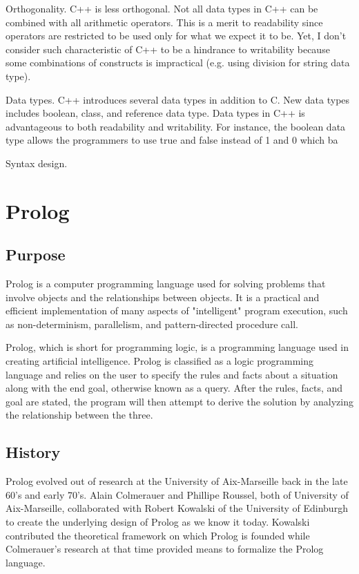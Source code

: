 \documentclass[a4paper, 12pt]{article}
\begin{document}
Orthogonality. C++ is less orthogonal. Not all data types in C++ can be combined with all arithmetic operators. This is a merit to readability since operators are restricted to be used only for what we expect it to be. Yet, I don't consider such characteristic of C++ to be a hindrance to writability because some combinations of constructs is impractical (e.g. using division for string data type). 
 
Data types. C++ introduces several data types in addition to C. New data types includes boolean, class, and reference data type. Data types in C++ is advantageous to both readability and writability. For instance, the boolean data type allows the programmers to use true and false instead of 1 and 0 which ba

Syntax design.




\newpage
\section{Prolog}
\subsection{Purpose}
Prolog is a computer programming language used for solving problems that involve objects and the relationships between objects. It is a practical and efficient implementation of many aspects of "intelligent" program execution, such as non-determinism, parallelism, and pattern-directed procedure call.

Prolog, which is short for programming logic, is a programming language used in creating artificial intelligence. Prolog is classified as a logic programming language and relies on the user to specify the rules and facts about a situation along with the end goal, otherwise known as a query. After the rules, facts, and goal are stated, the program will then attempt to derive the solution by analyzing the relationship between the three.
\subsection{History}
Prolog evolved out of research at the University of Aix-Marseille back in the late 60's and early 70's. Alain Colmerauer and Phillipe Roussel, both of University of Aix-Marseille, collaborated with Robert Kowalski of the University of Edinburgh to create the underlying design of Prolog as we know it today. Kowalski contributed the theoretical framework on which Prolog is founded while Colmerauer's research at that time provided means to formalize the Prolog language.
\end{document}
